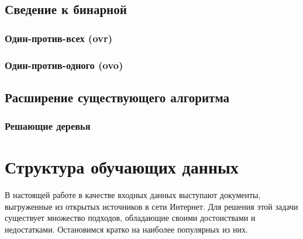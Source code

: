 \subsection{Сведение к бинарной}
\subsubsection{Один-против-всех (\acrshort{ovr})}
\subsubsection{Один-против-одного (\acrshort{ovo})}
\subsection{Расширение существующего алгоритма}
\subsubsection{Решающие деревья}
\section{Структура обучающих данных}
В настоящей работе в качестве входных данных выступают документы, выгруженные из открытых источников в сети Интернет.
Для решения этой задачи существует множество подходов, обладающие своими достоиствами и недостатками.
Остановимся кратко на наиболее популярных из них.
